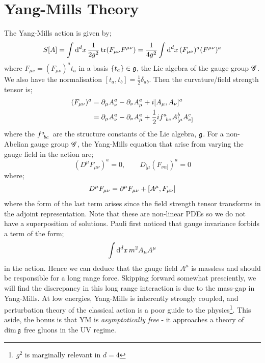 \section{Yang-Mills Theory}
The Yang-Mills action is given by;
\begin{equation}
S[A] = \int{\text{d}^d x \,\frac{1}{2g^2}\tr(F_{\mu\nu}F^{\mu\nu})} = \frac{1}{4g^2}\int{\text{d}^d x \,(F_{\mu\nu})^{a}(F^{\mu\nu})^a}
\end{equation}
where $F_{\mu\nu} = (F_{\mu\nu})^{a} t_a$ in a basis $\set{t_a} \in \alge$, the Lie algebra of the gauge group $\mathscr{G}$. We also have the normalisation $[t_a, t_b] = \tfrac{1}{2}\delta_{ab}$. Then the curvature/field strength tensor is;
\begin{align*}
(F_{\mu\nu})^{a} &= \del_\mu A_\nu^a - \del_\nu A_\mu^a + i[A_\mu, A_\nu]^a \\
&= \del_\mu A_\nu^a - \del_\nu A_\mu^a + \frac{1}{2}if\indices{^{a}_{bc}}A^b_{[\mu}A^c_{\nu]}
\end{align*}
where the $f\indices{^{a}_{bc}}$ are the structure constants of the Lie algebra, $\mathfrak{g}$. For a non-Abelian gauge group $\mathscr{G}$, the Yang-Mills equation that arise from varying the gauge field in the action are;
\begin{equation}
(D^\mu F_{\mu\nu})^a = 0, \qquad D_{[\mu}(F_{\nu\alpha]})^a = 0
\end{equation}
where;
\begin{equation}
D^\mu F_{\mu \nu} = \partial^\mu F_{\mu\nu} + [A^\mu, F_{\mu\nu}]
\end{equation}
where the form of the last term arises since the field strength tensor transforms in the adjoint representation. Note that these are non-linear PDEs so we do not have a superposition of solutions. Pauli first noticed that gauge invariance forbids a term of the form;
\begin{equation*}
\int{\text{d}^d x \,m^2 A_\mu A^\mu}
\end{equation*}
in the action. Hence we can deduce that the gauge field $A^\mu$ is massless and should be responsible for a long range force. Skipping forward somewhat presciently, we will find the discrepancy in this long range interaction is due to the mass-gap in Yang-Mills. At low energies, Yang-Mills is inherently strongly coupled, and perturbation theory of the classical action is a poor guide to the physics\footnote{$g^2$ is marginally relevant in $d = 4$}. This aside, the bonus is that YM is \emph{asymptotically free} - it approaches a theory of $\dim \mathfrak{g}$ free gluons in the UV regime.
